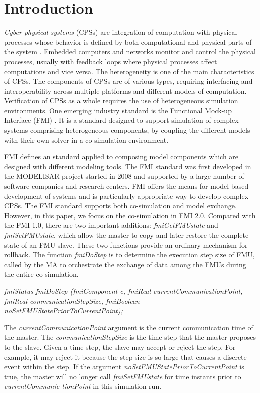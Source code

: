 \section{Introduction}

\textit{Cyber-physical systems} (CPSs)  are integration of computation with physical processes whose behavior is defined by both computational and physical parts of the system \cite{Zanero17}. Embedded computers and networks monitor and control the physical processes, usually with feedback loops where physical processes affect computations and vice versa. The heterogeneity is one of the main characteristics of CPSs. The components of CPSs are of various types, requiring interfacing and interoperability across multiple platforms and different models of computation. Verification of CPSs as a whole requires the use of heterogeneous simulation environments. One emerging industry
standard is the Functional Mock-up Interface (FMI) \cite{Blochwitz2011The}\cite{BromanBGLMTW13}. It
is a standard designed to support simulation of complex systems
comprising heterogeneous components, by coupling the different models with their own solver in a co-simulation environment.

FMI defines an standard applied to composing model components which are designed with different modeling tools. The FMI standard was first developed in the MODELISAR project started in 2008 and supported by a large number of software companies and research centers. FMI offers the means for model based development of systems and is particularly appropriate way to develop complex CPSs. The FMI standard supports both co-simulation and  model exchange. However, in this paper, we focus on the co-simulation in FMI 2.0.
Compared with the FMI 1.0, there are two important additions: \emph{fmiGetFMUstate} and \emph{fmiSetFMUstate}, which allow the master to copy and later restore the complete state of an FMU slave. These two functions provide an ordinary mechanism for rollback. The function \emph{fmiDoStep} is to determine the execution step size of FMU, called by the MA to orchestrate the exchange of data among the FMUs during the entire co-simulation. 

\emph{fmiStatus fmiDoStep (fmiComponent c, fmiReal currentCommunicationPoint, fmiReal communicationStepSize, fmiBoolean noSetFMUStatePriorToCurrentPoint);}

The \emph{currentCommunicationPoint} argument is the current communication time of the master. The \emph{communicationStepSize} is the time step that the master proposes to the slave. Given a time step, the slave may accept or reject the step. For example, it may reject it because the step size is so large that causes a discrete event within the step. If the argument \emph{noSetFMUStatePriorToCurrentPoint} is true, the master will no longer call \emph{fmiSetFMUstate} for time instants prior to \emph{currentCommunic tionPoint} in this simulation run. 

